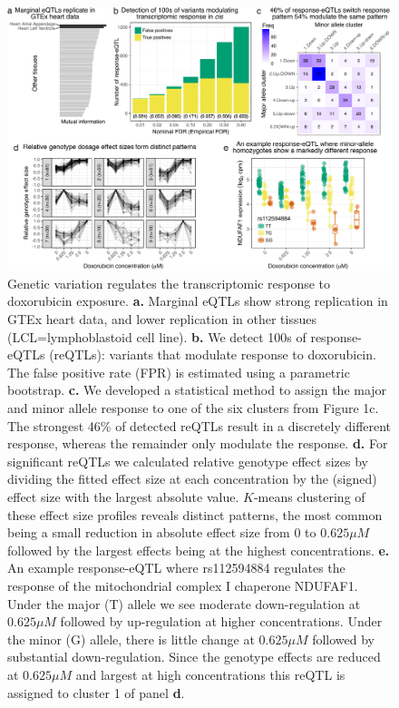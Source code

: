 \documentclass[9pt,lineno]{elife}
\begin{document}
\begin{figure}
\begin{fullwidth}
    \includegraphics[width=1\linewidth]{../figures/fig2.pdf}     \caption{Genetic variation regulates the transcriptomic response to doxorubicin exposure. \textbf{a.} Marginal eQTLs show strong replication in GTEx heart data, and lower replication in other tissues (LCL=lymphoblastoid cell line). \textbf{b.} We detect 100s of response-eQTLs (reQTLs): variants that modulate response to doxorubicin. The false positive rate (FPR) is estimated using a parametric bootstrap. \textbf{c.} We developed a statistical method to assign the major and minor allele response to one of the six clusters from Figure 1c. The strongest 46\% of detected reQTLs result in a discretely different response, whereas the remainder only modulate the response. \textbf{d.} For significant reQTLs we calculated relative genotype effect sizes by dividing the fitted effect size at each concentration by the (signed) effect size with the largest absolute value. $K$-means clustering of these effect size profiles reveals distinct patterns, the most common being a small reduction in absolute effect size from $0$ to $0.625\mu M$ followed by the largest effects being at the highest concentrations. \textbf{e.} An example response-eQTL where rs112594884 regulates the response of the mitochondrial complex I chaperone NDUFAF1. Under the major (T) allele we see moderate down-regulation at $0.625\mu M$ followed by up-regulation at higher concentrations. Under the minor (G) allele, there is little change at $0.625\mu M$ followed by substantial down-regulation. Since the genotype effects are reduced at $0.625\mu M$ and largest at high concentrations this reQTL is assigned to cluster 1 of panel \textbf{d}.}

\end{fullwidth}
\end{figure}
\end{document}
